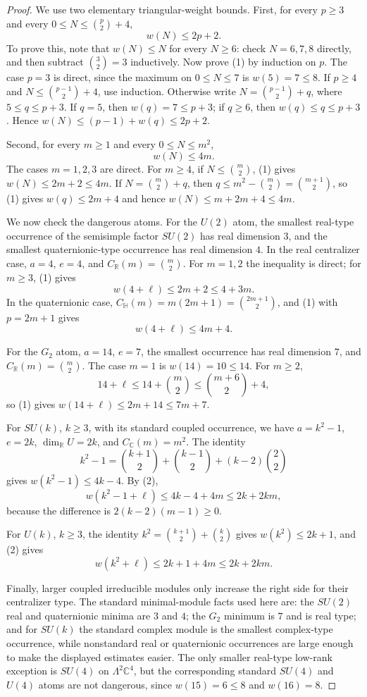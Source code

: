 \documentclass[11pt]{article}
\begin{document}
\begin{proof}
We use two elementary triangular-weight bounds.  First, for every $p\geq 3$
and every $0\leq N\leq \binom p2+4$,
\[
w(N)\leq 2p+2. \tag{1}
\]
To prove this, note that $w(N)\leq N$ for every $N\geq 6$: check
$N=6,7,8$ directly, and then subtract $\binom32=3$ inductively.  Now prove
(1) by induction on $p$.  The case $p=3$ is direct, since the maximum on
$0\leq N\leq 7$ is $w(5)=7\leq 8$.  If $p\geq 4$ and
$N\leq \binom{p-1}{2}+4$, use induction.  Otherwise write
$N=\binom{p-1}{2}+q$, where $5\leq q\leq p+3$.  If $q=5$, then
$w(q)=7\leq p+3$; if $q\geq 6$, then $w(q)\leq q\leq p+3$.  Hence
$w(N)\leq (p-1)+w(q)\leq 2p+2$.

Second, for every $m\geq 1$ and every $0\leq N\leq m^2$,
\[
w(N)\leq 4m. \tag{2}
\]
The cases $m=1,2,3$ are direct.  For $m\geq 4$, if
$N\leq \binom m2$, (1) gives $w(N)\leq 2m+2\leq 4m$.  If
$N=\binom m2+q$, then
$q\leq m^2-\binom m2=\binom{m+1}{2}$, so (1) gives
$w(q)\leq 2m+4$ and hence $w(N)\leq m+2m+4\leq 4m$.

We now check the dangerous atoms.  For the $U(2)$ atom, the smallest
real-type occurrence of the semisimple factor $SU(2)$ has real dimension
$3$, and the smallest quaternionic-type occurrence has real dimension $4$.
In the real centralizer case, $a=4$, $e=4$, and
$C_{\mathbb R}(m)=\binom m2$.  For $m=1,2$ the inequality is direct; for
$m\geq 3$, (1) gives
\[
w(4+\ell)\leq 2m+2\leq 4+3m.
\]
In the quaternionic case,
$C_{\mathbb H}(m)=m(2m+1)=\binom{2m+1}{2}$, and (1) with
$p=2m+1$ gives
\[
w(4+\ell)\leq 4m+4.
\]

For the $G_2$ atom, $a=14$, $e=7$, the smallest occurrence has real
dimension $7$, and $C_{\mathbb R}(m)=\binom m2$.  The case $m=1$ is
$w(14)=10\leq 14$.  For $m\geq 2$,
\[
14+\ell\leq 14+\binom m2\leq \binom{m+6}{2}+4,
\]
so (1) gives $w(14+\ell)\leq 2m+14\leq 7m+7$.

For $SU(k)$, $k\geq 3$, with its standard coupled occurrence, we have
$a=k^2-1$, $e=2k$, $\dim_{\mathbb R}U=2k$, and
$C_{\mathbb C}(m)=m^2$.  The identity
\[
k^2-1=\binom{k+1}{2}+\binom{k-1}{2}+(k-2)\binom22
\]
gives $w(k^2-1)\leq 4k-4$.  By (2),
\[
w(k^2-1+\ell)\leq 4k-4+4m\leq 2k+2km,
\]
because the difference is $2(k-2)(m-1)\geq 0$.

For $U(k)$, $k\geq 3$, the identity
$k^2=\binom{k+1}{2}+\binom k2$ gives $w(k^2)\leq 2k+1$, and (2) gives
\[
w(k^2+\ell)\leq 2k+1+4m\leq 2k+2km.
\]

Finally, larger coupled irreducible modules only increase the right side for
their centralizer type.  The standard minimal-module facts used here are:
the $SU(2)$ real and quaternionic minima are $3$ and $4$; the $G_2$ minimum
is $7$ and is real type; and for $SU(k)$ the standard complex module is the
smallest complex-type occurrence, while nonstandard real or quaternionic
occurrences are large enough to make the displayed estimates easier.  The
only smaller real-type low-rank exception is $SU(4)$ on
$\Lambda^2\mathbb C^4$, but the corresponding standard $SU(4)$ and $U(4)$
atoms are not dangerous, since $w(15)=6\leq 8$ and $w(16)=8$.
\end{proof}
\end{document}

